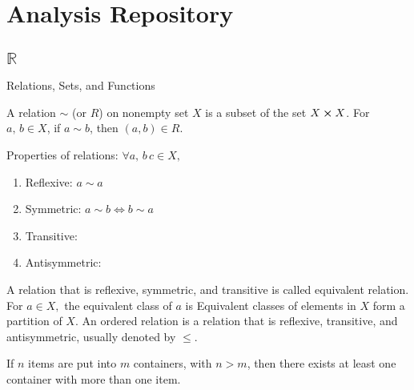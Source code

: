 \chapter{Analysis Repository}

\section{$\mathbb{R}$}
Relations, Sets, and Functions

\begin{definition}[Relation]
    A relation $\sim$ (or $R$) on nonempty set $X$ is a subset of the set $X\cross X$. For $a,\,b\in X$, if $a\sim b$, then $(a,b)\in R$.
\end{definition}

Properties of relations: $\forall a,\,b\,c\in X,$
\begin{enumerate}
    \item Reflexive: $a\sim a$
    \item Symmetric: $a\sim b \iff b\sim a$
    \item Transitive:
    \item Antisymmetric:
\end{enumerate}

A relation that is reflexive, symmetric, and transitive is called equivalent relation. For $a\in X,$ the equivalent class of $a$ is
Equivalent classes of elements in $X$ form a partition of $X.$ An ordered relation is a relation that is reflexive, transitive, and antisymmetric, usually denoted by $\leq.$


\begin{theorem}
    If $n$ items are put into $m$ containers, with $n>m$, then there exists at least one container with more than one item.
\end{theorem}

